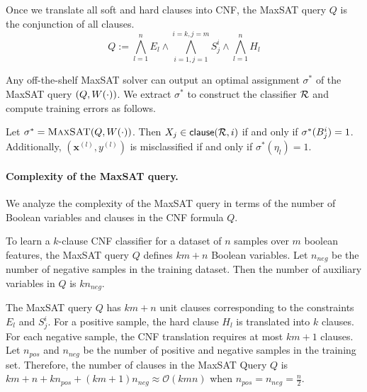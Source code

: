 Once we translate  all soft and hard clauses into CNF, the MaxSAT query $ Q $ is the conjunction of all clauses. 
\[
Q:= \bigwedge_{l=1}^n E_l \wedge  \bigwedge_{i=1,j=1}^{i=k,j=m} S_j^i \wedge \bigwedge_{l=1}^n H_l 
\]
		
Any off-the-shelf MaxSAT solver can output an optimal assignment $ \sigma^* $ of the MaxSAT query $ (Q, W \! \left( \cdot \right)) $. We extract $ \sigma^* $ to construct the classifier $ {\mathcal{R}} $ and compute training errors as follows.
\begin{construction}
	\label{interpretability_imli_construction:rule}
	Let $\sigma^* = \textsc{MaxSAT}(Q,W \! \left( \cdot \right))$. Then $X_j \in {\ensuremath{\mathsf{clause}}(\ensuremath{{\mathcal{R}}},i)}$ if and only if $\sigma^*(B_{j}^{i}) = 1$. Additionally, $ (\mathbf{x}^{(l)}, y^{(l)}) $ is misclassified if and only if $ \sigma^*(\eta_l) = 1 $.
\end{construction}




	
	
	 
\paragraph{Complexity of the MaxSAT query.}

We analyze the complexity of the MaxSAT query in terms of the number of Boolean variables and clauses in the CNF formula $ Q $. 

\begin{proposition}
	\label{interpretability_imli_prop:maxsat_variables}
	 To learn a $ k $-clause CNF classifier for a dataset of  $ n $ samples over $ m $ boolean features, the MaxSAT query $ Q $ defines $ km +n $ Boolean variables. Let $ n_{neg} $ be the number of negative samples in the training dataset. Then the number of auxiliary variables in $ Q $ is  $ kn_{neg}  $.
\end{proposition}


\begin{proposition}
	\label{interpretability_imli_prop:maxsat_clauses}
	The MaxSAT query $ Q $ has $ k m+n $ unit clauses corresponding to the constraints $ E_l $ and $ S_j^i $. For a positive sample, the hard clause $ H_l $ is translated into $ k $  clauses. For each negative sample, the CNF translation requires at most $ k m+1 $ clauses. Let $ n_{pos} $ and $ n_{neg} $ be the number of positive and negative samples in the training set. Therefore, the number of clauses in the MaxSAT Query $ Q $ is $ k m+n+k n_{pos}+(k m+1)n_{neg} \approx \mathcal{O}(k m  n ) $ when $ n_{pos}= n_{neg} =\frac{n}{2} $. 
\end{proposition}

